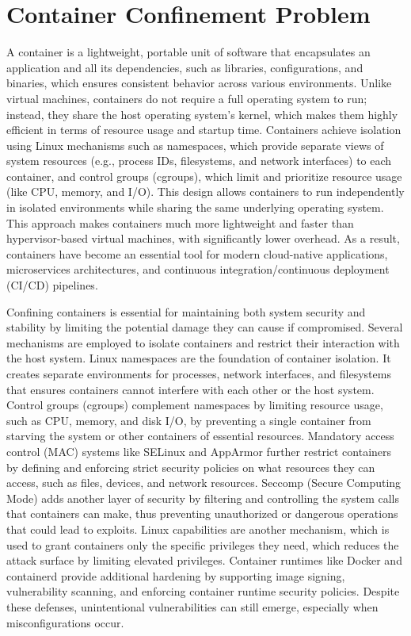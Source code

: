 \section{Container Confinement Problem}
\label{sec:confinement}



A container is a lightweight, portable unit of software that encapsulates an application and all its dependencies, such as libraries, configurations, and binaries, which ensures consistent behavior across various environments. Unlike virtual machines, containers do not require a full operating system to run; instead, they share the host operating system’s kernel, which makes them highly efficient in terms of resource usage and startup time. Containers achieve isolation using Linux mechanisms such as namespaces, which provide separate views of system resources (e.g., process IDs, filesystems, and network interfaces) to each container, and control groups (cgroups), which limit and prioritize resource usage (like CPU, memory, and I/O). This design allows containers to run independently in isolated environments while sharing the same underlying operating system. This approach makes containers much more lightweight and faster than hypervisor-based virtual machines, with significantly lower overhead. As a result, containers have become an essential tool for modern cloud-native applications, microservices architectures, and continuous integration/continuous deployment (CI/CD) pipelines.

Confining containers is essential for maintaining both system security and stability by limiting the potential damage they can cause if compromised. Several mechanisms are employed to isolate containers and restrict their interaction with the host system. Linux namespaces are the foundation of container isolation. It creates separate environments for processes, network interfaces, and filesystems that ensures containers cannot interfere with each other or the host system. Control groups (cgroups) complement namespaces by limiting resource usage, such as CPU, memory, and disk I/O, by preventing a single container from starving the system or other containers of essential resources. Mandatory access control (MAC) systems like SELinux and AppArmor further restrict containers by defining and enforcing strict security policies on what resources they can access, such as files, devices, and network resources. Seccomp (Secure Computing Mode) adds another layer of security by filtering and controlling the system calls that containers can make, thus preventing unauthorized or dangerous operations that could lead to exploits. Linux capabilities are another mechanism, which is used to grant containers only the specific privileges they need, which reduces the attack surface by limiting elevated privileges. Container runtimes like Docker and containerd provide additional hardening by supporting image signing, vulnerability scanning, and enforcing container runtime security policies. Despite these defenses, unintentional vulnerabilities can still emerge, especially when misconfigurations occur.

